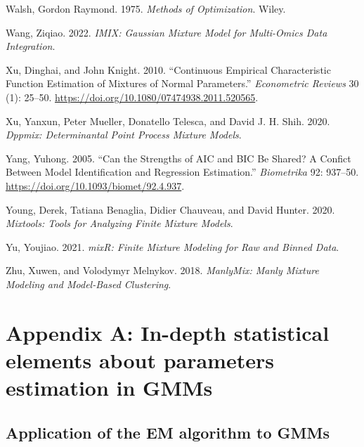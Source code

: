 \begin{CSLReferences}{1}{0}
\leavevmode{}%
Walsh, Gordon Raymond. 1975. \emph{Methods of {Optimization}}. {Wiley}.

\leavevmode{}%
Wang, Ziqiao. 2022. \emph{IMIX: Gaussian Mixture Model for Multi-Omics Data Integration}.

\leavevmode{}%
Xu, Dinghai, and John Knight. 2010. {``Continuous {Empirical Characteristic Function Estimation} of {Mixtures} of {Normal Parameters}.''} \emph{Econometric Reviews} 30 (1): 25--50. \url{https://doi.org/10.1080/07474938.2011.520565}.

\leavevmode{}%
Xu, Yanxun, Peter Mueller, Donatello Telesca, and David J. H. Shih. 2020. \emph{Dppmix: Determinantal Point Process Mixture Models}.

\leavevmode{}%
Yang, Yuhong. 2005. {``Can the Strengths of {AIC} and {BIC} Be Shared? {A} Confict Between Model Identification and Regression Estimation.''} \emph{Biometrika} 92: 937--50. \url{https://doi.org/10.1093/biomet/92.4.937}.

\leavevmode{}%
Young, Derek, Tatiana Benaglia, Didier Chauveau, and David Hunter. 2020. \emph{Mixtools: Tools for Analyzing Finite Mixture Models}.

\leavevmode{}%
Yu, Youjiao. 2021. \emph{mixR: Finite Mixture Modeling for Raw and Binned Data}.

\leavevmode{}%
Zhu, Xuwen, and Volodymyr Melnykov. 2018. \emph{ManlyMix: Manly Mixture Modeling and Model-Based Clustering}.

\end{CSLReferences}

\appendix

\hypertarget{appendix-a-in-depth-statistical-elements-about-parameters-estimation-in-gmms}{%
\section{Appendix A: In-depth statistical elements about parameters estimation in GMMs}\label{appendix-a-in-depth-statistical-elements-about-parameters-estimation-in-gmms}}

\hypertarget{application-of-the-em-algorithm-to-gmms}{%
\subsection{Application of the EM algorithm to GMMs}\label{application-of-the-em-algorithm-to-gmms}}

